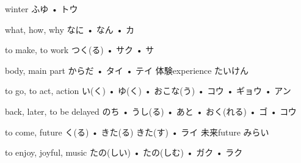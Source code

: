 



\setcounter{cardnum}{17}

		{winter}
		{ふゆ • トウ}
		{}{}
		{}{}
		{}{}
		{}{}
		{}{}

		{what, how, why}
		{なに • なん • カ}
		{}{}
		{}{}
		{}{}
		{}{}
		{}{}

		{to make, to work}
		{つく(る) • サク • サ}
		{}{}
		{}{}
		{}{}
		{}{}
		{}{}

		{body, main part}
		{からだ • タイ • テイ}
		{体験}{experience たいけん}
		{}{}
		{}{}
		{}{}
		{}{}

		{to go, to act, action}
		{い(く) • ゆ(く) • おこな(う) • コウ • ギョウ • アン}
		{}{}
		{}{}
		{}{}
		{}{}
		{}{}

		{back, later, to be delayed}
		{のち • うし(る) • あと • おく(れる) • ゴ • コウ}
		{}{}
		{}{}
		{}{}
		{}{}
		{}{}

		{to come, future}
		{く(る) • きた(る) きた(す) • ライ}
		{未来}{future みらい}
		{}{}
		{}{}
		{}{}
		{}{}

		{to enjoy, joyful, music}
		{たの(しい) • たの(しむ) • ガク • ラク}
		{}{}
		{}{}
		{}{}
		{}{}
		{}{}


